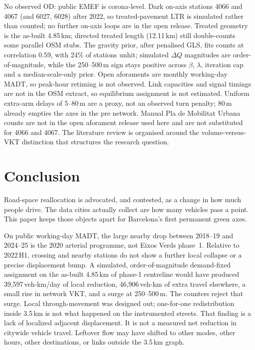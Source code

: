 \documentclass[a4paper,fleqn]{cas-dc}
\newcommand{\DQ}{\Delta Q}
\begin{document}
No observed OD: public EMEF is corona-level. Dark on-axis stations 4066 and
4067 (and 6027, 6028) after 2022, so treated-pavement LTR is simulated rather
than counted; no further on-axis loops are in the open release. Treated
geometry is the as-built 4.85\,km; directed treated length (12.11\,km) still
double-counts some parallel OSM stubs. The gravity prior, after penalised
GLS, fits counts at correlation 0.59, with 24\% of stations unhit; simulated
$\DQ$ magnitudes are order-of-magnitude, while the 250--500\,m sign stays
positive across $\beta$, $\lambda$, iteration cap and a median-scale-only
prior. Open aforaments are monthly working-day MADT, so peak-hour retiming is
not observed. Link capacities and signal timings are not in the OSM extract,
so equilibrium assignment is not estimated. Uniform extra-arm delays of
5--80\,m are a proxy, not an observed turn penalty; 80\,m already empties
the axes in the pre network. Manual Pla de Mobilitat Urbana counts are not
in the open aforament release used here and are not substituted for 4066
and 4067. The literature review is
organised around the volume-versus-VKT distinction that structures the
research question.

\section{Conclusion}
\label{sec:conc}

Road-space reallocation is advocated, and contested, as a change in how much
people drive. The data cities actually collect are how many vehicles pass a
point. This paper keeps those objects apart for Barcelona's first permanent
green axes.

On public working-day MADT, the large nearby drop between 2018--19 and
2024--25 is the 2020 arterial programme, not Eixos Verds phase~1. Relative to
2022\,H1, crossing and nearby stations do not show a further local collapse or
a precise displacement bump. A simulated, order-of-magnitude demand-fixed
assignment on the as-built 4.85\,km of phase-1 centreline would have produced
39{,}597\,veh-km/day of local reduction, 46{,}906\,veh-km of extra travel
elsewhere, a small rise in network VKT, and a surge at 250--500\,m. The
counters reject that surge.
Local through-movement was designed out; one-for-one redistribution inside
3.5\,km is not what happened on the instrumented streets. That finding is a
lack of localized adjacent displacement. It is not a measured net reduction
in citywide vehicle travel. Leftover flow may have shifted to other modes,
other hours, other destinations, or links outside the 3.5\,km graph.
\end{document}
